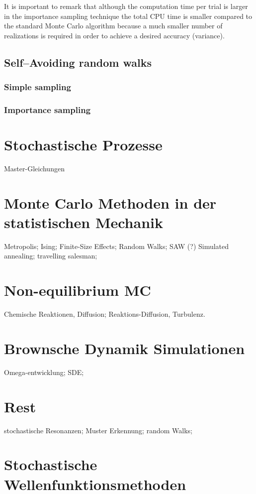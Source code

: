It is important to remark that although the computation time per
trial is larger in the importance sampling technique the total CPU 
time is smaller compared to the standard Monte Carlo algorithm 
because a much smaller number of realizations is required in order
to achieve a desired accuracy (variance).





\section{Self--Avoiding random walks}
\subsection{Simple sampling}
\subsection{Importance sampling}
\chapter{Stochastische Prozesse}
Master-Gleichungen

\chapter{Monte Carlo Methoden in der statistischen Mechanik}
Metropolis; Ising; Finite-Size Effects; Random Walks; SAW (?)
Simulated annealing; travelling salesman;

\chapter{Non-equilibrium MC}
Chemische Reaktionen, Diffusion; Reaktions-Diffusion, Turbulenz.

\chapter{Brownsche Dynamik Simulationen}
Omega-entwicklung; SDE;


\chapter{Rest}
stochastische Resonanzen; Muster Erkennung; random Walks;

\chapter{Stochastische Wellenfunktionsmethoden}
